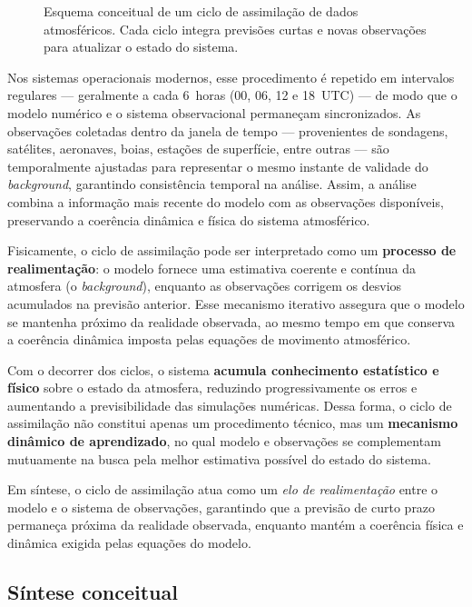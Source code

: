 \begin{figure}[h!]
\centering

\caption{Esquema conceitual de um ciclo de assimilação de dados atmosféricos. Cada ciclo integra previsões curtas e novas observações para atualizar o estado do sistema.}
\label{fig:cycle}
\end{figure}

Nos sistemas operacionais modernos, esse procedimento é repetido em intervalos regulares — geralmente a cada 6~horas (00, 06, 12 e 18~UTC) — de modo que o modelo numérico e o sistema observacional permaneçam sincronizados.  
As observações coletadas dentro da janela de tempo — provenientes de sondagens, satélites, aeronaves, boias, estações de superfície, entre outras — são temporalmente ajustadas para representar o mesmo instante de validade do \textit{background}, garantindo consistência temporal na análise.  
Assim, a análise combina a informação mais recente do modelo com as observações disponíveis, preservando a coerência dinâmica e física do sistema atmosférico.

Fisicamente, o ciclo de assimilação pode ser interpretado como um \textbf{processo de realimentação}: o modelo fornece uma estimativa coerente e contínua da atmosfera (o \textit{background}), enquanto as observações corrigem os desvios acumulados na previsão anterior.  
Esse mecanismo iterativo assegura que o modelo se mantenha próximo da realidade observada, ao mesmo tempo em que conserva a coerência dinâmica imposta pelas equações de movimento atmosférico.

Com o decorrer dos ciclos, o sistema \textbf{acumula conhecimento estatístico e físico} sobre o estado da atmosfera, reduzindo progressivamente os erros e aumentando a previsibilidade das simulações numéricas.  
Dessa forma, o ciclo de assimilação não constitui apenas um procedimento técnico, mas um \textbf{mecanismo dinâmico de aprendizado}, no qual modelo e observações se complementam mutuamente na busca pela melhor estimativa possível do estado do sistema.

Em síntese, o ciclo de assimilação atua como um \textit{elo de realimentação} entre o modelo e o sistema de observações, garantindo que a previsão de curto prazo permaneça próxima da realidade observada, enquanto mantém a coerência física e dinâmica exigida pelas equações do modelo.

\subsection*{Síntese conceitual}


